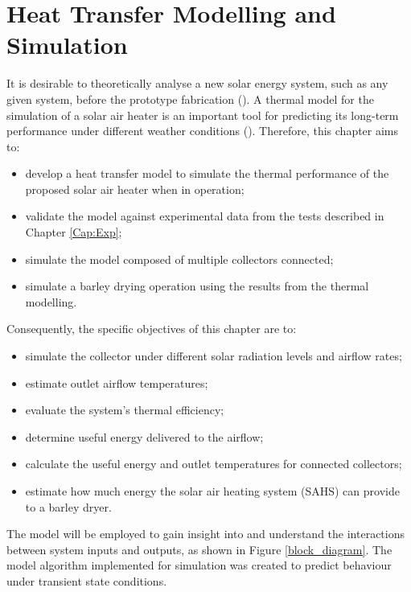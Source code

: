 \chapter{Heat Transfer Modelling and Simulation}
\label{Cap:Thermal}

It is desirable to theoretically analyse a new solar energy system, such as any given system, before the prototype fabrication (\cite{Tchinda2008}). A thermal model for the simulation of a solar air heater is an important tool for predicting its long-term performance under different weather conditions (\cite{Shams2013}). Therefore, this chapter aims to: 

\begin{itemize}[topsep=5pt,partopsep=0pt] \itemsep0pt
	\item develop a heat transfer model to simulate the thermal performance of the proposed solar air heater when in operation;
	\item validate the model against experimental data from the tests described in Chapter \ref{Cap:Exp};
	\item simulate the model composed of multiple collectors connected;
	\item simulate a barley drying operation using the results from the thermal modelling.
\end{itemize}

Consequently, the specific objectives of this chapter are to:

\begin{itemize}[topsep=5pt,partopsep=0pt] \itemsep0pt
	\item simulate the collector under different solar radiation levels and airflow rates;
	\item estimate outlet airflow temperatures;
	\item evaluate the system's thermal efficiency;
	\item determine useful energy delivered to the airflow;
	\item calculate the useful energy and outlet temperatures for connected collectors;
	\item estimate how much energy the solar air heating system (SAHS) can provide to a barley dryer.
\end{itemize}

The model will be employed to gain insight into and understand the interactions between system inputs and outputs, as shown in Figure \ref{block_diagram}. The model algorithm implemented for simulation was created to predict behaviour under transient state conditions. 

